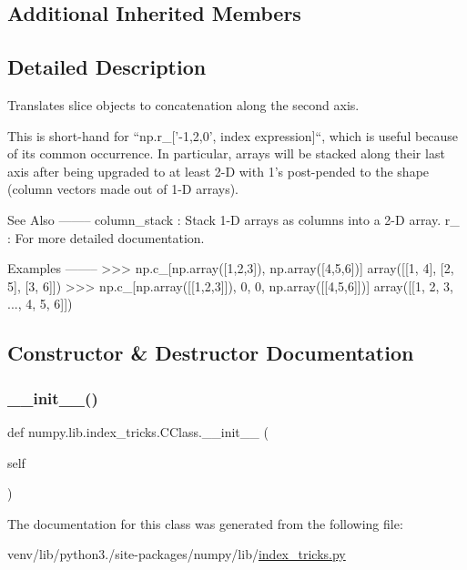 \subsection*{Additional Inherited Members}


\subsection{Detailed Description}
\begin{DoxyVerb}Translates slice objects to concatenation along the second axis.

This is short-hand for ``np.r_['-1,2,0', index expression]``, which is
useful because of its common occurrence. In particular, arrays will be
stacked along their last axis after being upgraded to at least 2-D with
1's post-pended to the shape (column vectors made out of 1-D arrays).

See Also
--------
column_stack : Stack 1-D arrays as columns into a 2-D array.
r_ : For more detailed documentation.

Examples
--------
>>> np.c_[np.array([1,2,3]), np.array([4,5,6])]
array([[1, 4],
       [2, 5],
       [3, 6]])
>>> np.c_[np.array([[1,2,3]]), 0, 0, np.array([[4,5,6]])]
array([[1, 2, 3, ..., 4, 5, 6]])\end{DoxyVerb}
 

\subsection{Constructor \& Destructor Documentation}
\mbox{\label{classnumpy_1_1lib_1_1index__tricks_1_1CClass_af1423169c5c092c69d5a6a65275dbebe}} 
\subsubsection{\texorpdfstring{\+\_\+\+\_\+init\+\_\+\+\_\+()}{\_\_init\_\_()}}
{\footnotesize\ttfamily def numpy.\+lib.\+index\+\_\+tricks.\+C\+Class.\+\_\+\+\_\+init\+\_\+\+\_\+ (\begin{DoxyParamCaption}\item[{}]{self }\end{DoxyParamCaption})}



The documentation for this class was generated from the following file\+:\begin{DoxyCompactItemize}
\item 
venv/lib/python3./site-\/packages/numpy/lib/\hyperlink{lib_2index__tricks_8py}{index\+\_\+tricks.\+py}\end{DoxyCompactItemize}

